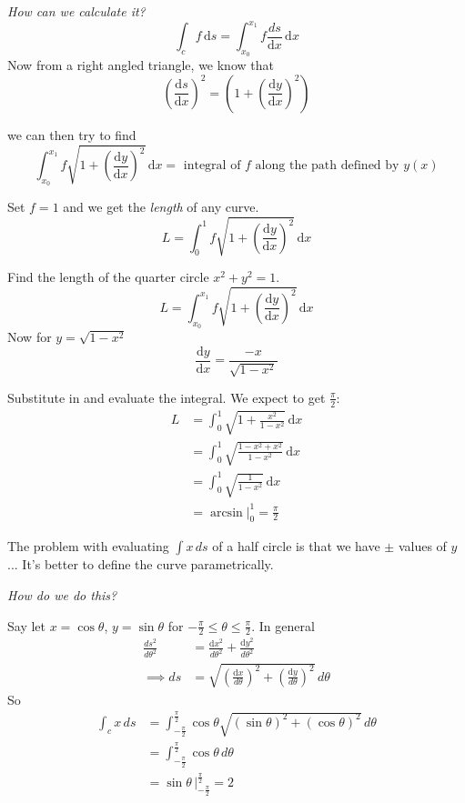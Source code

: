 \documentclass[10pt]{scrartcl}
\begin{document}
\emph{How can we calculate it?}
\[
  \int_c f\,\mathrm{d}s  = \int_{x_0}^{x_1} f\frac{ds}{\mathrm{d}x}\,\mathrm{d}x 
\]
Now from a right angled triangle, we know that
\[
 \left(\frac{\mathrm{d}s}{\mathrm{d}x}\right)^2 = \left(1 + \left(\frac{\mathrm{d}y}{\mathrm{d}x}\right)^2\right)
\]

we can then try to find \[\int_{x_0}^{x_1} f\sqrt{1 + \left(\frac{\mathrm{d}y}{\mathrm{d}x}\right)^2}\,\mathrm{d}x = \mbox{ integral of $f$ along the path defined by $y(x)$}\]

Set $f =1 $ and we get the \emph{length} of any curve. 
\[
  L = \int_{0}^{1} f\sqrt{1 + \left(\frac{\mathrm{d}y}{\mathrm{d}x}\right)^2}\,\mathrm{d}x
\]

\begin{example}Find the length of the quarter circle $x^2 + y^2 = 1$. 
\[
  L = \int_{x_0}^{x_1} f\sqrt{1 + \left(\frac{\mathrm{d}y}{\mathrm{d}x}\right)^2}\,\mathrm{d}x
\]
Now for $y = \sqrt{1 - x^2}$
\[
  \frac{\mathrm{d}y}{\mathrm{d}x} = \frac{-x}{\sqrt{1-x^2}}
\]

Substitute in and evaluate the integral. We expect to get $\frac{\pi}{2}$: 
\begin{align*}
  L &= \int_0^1 \sqrt{1 + \frac{x^2}{1-x^2}}\,\mathrm{d}x\\
  &= \int_0^1 \sqrt{\frac{1-x^2 + x^2}{1-x^2}}\,\mathrm{d}x\\
  &= \int_0^1 \sqrt{\frac{1}{1-x^2}}\,\mathrm{d}x\\
  &= \left.\arcsin\right|_0^1 = \frac{\pi}{2}
\end{align*}
\end{example}\vsp

The problem with  evaluating  $\int x \,ds$ of a half circle is that we have $\pm$ values of $y$... It's better to define the curve parametrically. 

\emph{How do we do this?}

Say let $x = \cos\theta$, $y = \sin\theta$ for $-\frac{\pi}{2} \leq \theta \leq \frac{\pi}{2}$. In general 
\begin{align*}
  \frac{ds^2}{d\theta^2} &= \frac{\mathrm{d}x^2}{d\theta^2} + \frac{\mathrm{d}y^2}{d\theta^2}\\[.2cm]
\implies ds  &= \sqrt{\left(\frac{\mathrm{d}x}{d\theta}\right)^2 + \left(\frac{\mathrm{d}y}{d\theta}\right)^2}\,d\theta 
\end{align*}
So 
\begin{align*}
  \int_c x\,ds &= \int_{-\frac{\pi}{2}}^{\frac{\pi}{2}} \cos\theta \sqrt{(\sin\theta)^2 + (\cos\theta)^2}\,d\theta\\
  &=  \int_{-\frac{\pi}{2}}^{\frac{\pi}{2}}  \cos\theta\,d\theta \\
  &= \left.\sin\theta\,\right|_{-\frac{\pi}{2}}^{\frac{\pi}{2}} = 2
\end{align*}
\end{document}
